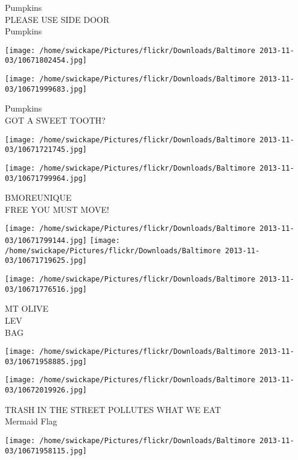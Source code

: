 \documentclass[10pt,letterpaper]{article}
\begin{document}
Pumpkins\\
PLEASE USE SIDE DOOR\\
Pumpkins\\
\pagebreak

\texttt{[image: /home/swickape/Pictures/flickr/Downloads/Baltimore 2013-11-03/10671802454.jpg]}

\vspace{0.25in}
\texttt{[image: /home/swickape/Pictures/flickr/Downloads/Baltimore 2013-11-03/10671999683.jpg]}

Pumpkins\\
GOT A SWEET TOOTH?\\
\pagebreak

\texttt{[image: /home/swickape/Pictures/flickr/Downloads/Baltimore 2013-11-03/10671721745.jpg]}

\vspace{0.25in}
\texttt{[image: /home/swickape/Pictures/flickr/Downloads/Baltimore 2013-11-03/10671799964.jpg]}

BMOREUNIQUE\\
FREE YOU MUST MOVE!\\
\pagebreak

\texttt{[image: /home/swickape/Pictures/flickr/Downloads/Baltimore 2013-11-03/10671799144.jpg]}
\texttt{[image: /home/swickape/Pictures/flickr/Downloads/Baltimore 2013-11-03/10671719625.jpg]}

\vspace{0.25in}
\texttt{[image: /home/swickape/Pictures/flickr/Downloads/Baltimore 2013-11-03/10671776516.jpg]}

MT OLIVE\\
LEV\\
BAG\\
\pagebreak

\texttt{[image: /home/swickape/Pictures/flickr/Downloads/Baltimore 2013-11-03/10671958885.jpg]}

\vspace{0.25in}
\texttt{[image: /home/swickape/Pictures/flickr/Downloads/Baltimore 2013-11-03/10672019926.jpg]}

TRASH IN THE STREET POLLUTES WHAT WE EAT\\
Mermaid Flag\\
\pagebreak

\texttt{[image: /home/swickape/Pictures/flickr/Downloads/Baltimore 2013-11-03/10671958115.jpg]}
\end{document}
